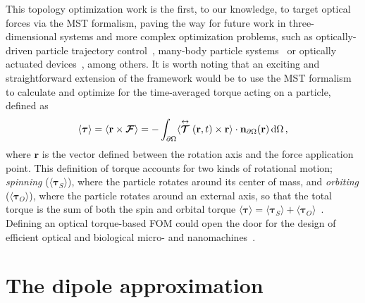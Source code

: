 This topology optimization work is the first, to our knowledge, to 
target optical forces via the MST formalism, paving the way for future work in three-dimensional systems and more complex optimization problems, such as optically-driven particle
trajectory control~\cite{zemanek_perspective_2019, macdonald_microfluidic_2003, shilkin_directional_2017}, many-body particle systems~\cite{bechinger_active_2016, chang_colloquium_2018} or optically actuated devices~\cite{ivanyi_optically_2024}, among others. It is worth noting that an exciting and straightforward extension of the framework would be to use the MST formalism to calculate and optimize for the time-averaged torque acting on a particle, defined as~\cite{novotny}
\begin{equation}\label{eq:torque}
    \langle \bm{\tau} \rangle = \langle \mathbf{r} \times \bm{\mathcal{F}} \rangle = - \int_{\partial \Omega} \langle \stackrel{\leftrightarrow}{\bm{\mathcal{T}}}(\mathbf{r},t)
    \times \mathbf{r} \rangle \cdot \mathbf{n}_{\partial \Omega}(\mathbf{r}) \mathop{}\!\text{d}\Omega \,,
\end{equation}
where $\mathbf{r}$ is the vector defined between the rotation axis and the force application point. This definition of torque accounts
for two kinds of rotational motion; \textit{spinning} ($\langle \bm{\tau}_S \rangle$), where the particle rotates around its center of mass,
and \textit{orbiting} ($\langle \bm{\tau}_O \rangle$), where the particle rotates around an external axis, so that the total torque is the sum
of both the spin and orbital torque $\langle \bm{\tau} \rangle = \langle \bm{\tau}_S \rangle + \langle \bm{\tau}_O \rangle$~\cite{torque}.  Defining 
an optical torque-based FOM could open the door for the design of efficient optical and biological micro- and nanomachines~\cite{rotating, gluck}.

\section{The dipole approximation~\cite{ownpub1, ownpub3}}\label{sec:dip}

